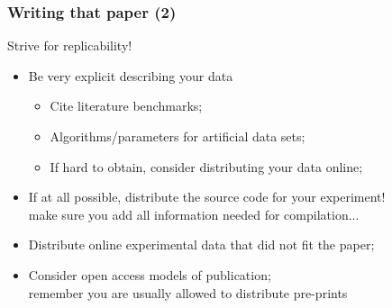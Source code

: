 \documentclass{beamer}
\begin{document}
\begin{frame}
  \frametitle{Writing that paper (2)}
  \begin{block}{Strive for replicability!}
    \begin{itemize}
    \item Be very explicit describing your data
      \begin{itemize}
        \item Cite literature benchmarks;
        \item Algorithms/parameters for artificial data sets;
        \item If hard to obtain, consider distributing your data
          online;
      \end{itemize}
      \medskip

    \item If at all possible, distribute the source code for your
      experiment!\\
      {\tiny make sure you add all information needed for compilation...}
      \medskip

    \item Distribute online experimental data that did not fit the
      paper;
      \medskip

    \item Consider open access models of publication;\\
      {\tiny remember you are usually allowed to distribute pre-prints}
    \end{itemize}
  \end{block}
\end{frame}
\end{document}
